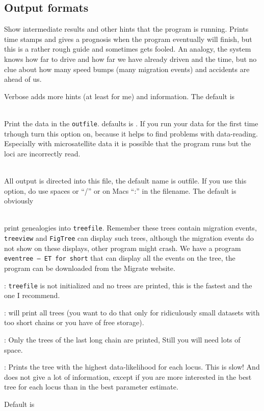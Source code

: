 \subsection{Output formats}
\begin{description}
\item{} 
Show intermediate results and other hints that the program is running.
Prints time stamps and gives a prognosis when the program eventually
will finish, but this is a rather rough guide and sometimes gets fooled.
An analogy, the system knows how far to drive and how far we have 
already driven and the time, but no clue about how many speed bumps 
(many migration events) and accidents are ahead of us.
\par
Verbose adds more hints (at least for me) and information.
The default is {}
\item{} \\
Print the data in the {\tt outfile}. defaults is {}. If you run your data for the first time trhough \migrate turn this option on, because it helps to find problems with data-reading. Especially with microsatellite data it is possible that the program runs but the loci are incorrectly read.
\item{}\\
 All output is directed into this file, the default name is outfile. If you use this option, do {} use spaces  or ``/'' or on Macs ``:'' in the filename.
The default is obviously {}

\item{}\\
print genealogies into {\tt treefile}. Remember these trees contain
migration events, {\tt treeview} \cite{page:1996} and {\tt FigTree} \cite{Rambaut:2006} can display such trees, although the migration events
do not show on these displays, other program might crash. We have a program {\tt eventree -- ET for short} that can display all the events on the tree, the program can be downloaded from the Migrate website.
\begin{description}

\item{{}:} {\tt treefile} is not initialized and no trees are printed, 
this is the fastest and the one I recommend.

\item{{}:}  will print all trees (you want to do that only for ridiculously small datasets with too short chains or you have {} of free storage).
\item{{}:} Only the trees of the last long chain are printed, 
Still you will need lots of space.
\item{{}:} Prints the tree with the highest data-likelihood for each locus.
This is slow! And does not give a lot of information,  except if you are more interested in the best tree for each locus than in the best parameter estimate.
\end{description}
Default is {}


\end{description}
